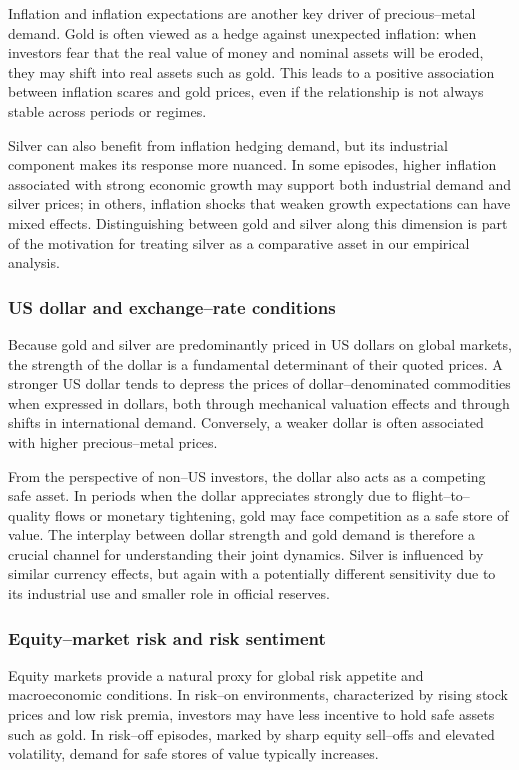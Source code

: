 Inflation and inflation expectations are another key driver of precious–metal demand. Gold
is often viewed as a hedge against unexpected inflation: when investors fear that the real
value of money and nominal assets will be eroded, they may shift into real assets such as
gold. This leads to a positive association between inflation scares and gold prices, even
if the relationship is not always stable across periods or regimes.

Silver can also benefit from inflation hedging demand, but its industrial component makes
its response more nuanced. In some episodes, higher inflation associated with strong
economic growth may support both industrial demand and silver prices; in others, inflation
shocks that weaken growth expectations can have mixed effects. Distinguishing between gold
and silver along this dimension is part of the motivation for treating silver as a
comparative asset in our empirical analysis.
\subsubsection{US dollar and exchange–rate conditions}

Because gold and silver are predominantly priced in US dollars on global markets, the
strength of the dollar is a fundamental determinant of their quoted prices. A stronger US
dollar tends to depress the prices of dollar–denominated commodities when expressed in
dollars, both through mechanical valuation effects and through shifts in international
demand. Conversely, a weaker dollar is often associated with higher precious–metal prices.

From the perspective of non–US investors, the dollar also acts as a competing safe asset.
In periods when the dollar appreciates strongly due to flight–to–quality flows or monetary
tightening, gold may face competition as a safe store of value. The interplay between
dollar strength and gold demand is therefore a crucial channel for understanding their
joint dynamics. Silver is influenced by similar currency effects, but again with a
potentially different sensitivity due to its industrial use and smaller role in official
reserves.
\subsubsection{Equity–market risk and risk sentiment}

Equity markets provide a natural proxy for global risk appetite and macroeconomic
conditions. In risk–on environments, characterized by rising stock prices and low risk
premia, investors may have less incentive to hold safe assets such as gold. In risk–off
episodes, marked by sharp equity sell–offs and elevated volatility, demand for safe stores
of value typically increases.


